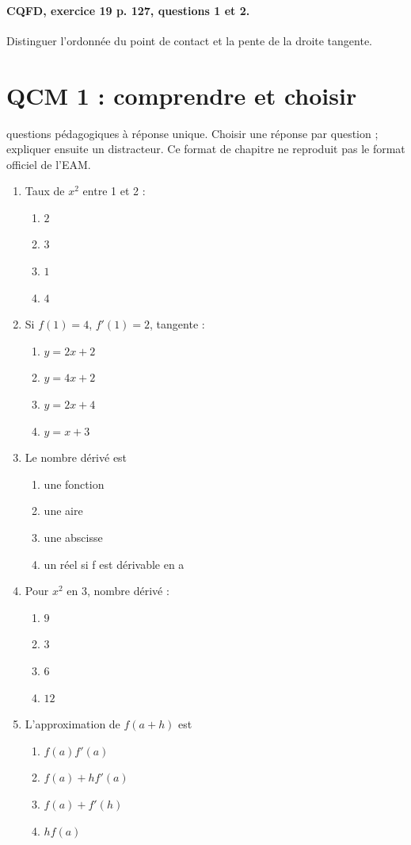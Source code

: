 \paragraph{CQFD, exercice 19 p. 127, questions 1 et 2.}\label{C04-M2} Distinguer l’ordonnée du point de contact et la pente de la droite tangente.
\begingroup\small
\mxnewpage\section*{QCM 1 : comprendre et choisir}\label{C04-Q1}
 questions pédagogiques à réponse unique. Choisir une réponse par question ; expliquer ensuite un distracteur. Ce format de chapitre ne reproduit pas le format officiel de l’EAM.
\begin{enumerate}
\item Taux de $x^2$ entre 1 et 2 :
\begin{enumerate}[label=\Alph*.,itemsep=2pt]
\item $2$
\item $3$
\item $1$
\item $4$
\end{enumerate}
\item Si $f(1)=4$, $f\prime(1)=2$, tangente :
\begin{enumerate}[label=\Alph*.,itemsep=2pt]
\item $y=2x+2$
\item $y=4x+2$
\item $y=2x+4$
\item $y=x+3$
\end{enumerate}
\item Le nombre dérivé est
\begin{enumerate}[label=\Alph*.,itemsep=2pt]
\item une fonction
\item une aire
\item une abscisse
\item un réel si f est dérivable en a
\end{enumerate}
\item Pour $x^2$ en 3, nombre dérivé :
\begin{enumerate}[label=\Alph*.,itemsep=2pt]
\item $9$
\item $3$
\item $6$
\item $12$
\end{enumerate}
\item L’approximation de $f(a+h)$ est
\begin{enumerate}[label=\Alph*.,itemsep=2pt]
\item $f(a)f\prime(a)$
\item $f(a)+hf\prime(a)$
\item $f(a)+f\prime(h)$
\item $hf(a)$
\end{enumerate}
\end{enumerate}
